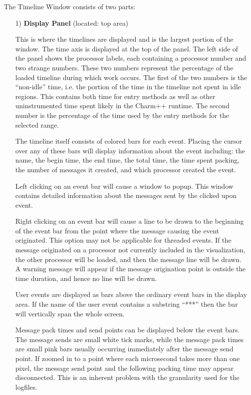 \documentclass[10pt]{report}
\begin{document}
The Timeline Window consists of two parts:
\begin{enumerate}
\item[1)]
{\bf Display Panel} (located: top area)

This is where the timelines are displayed and is the largest portion
of the window.  The time axis is displayed at the top 
of the panel.  The left side of the
panel shows the processor labels, each containing a processor number and
two strange numbers. These two numbers represent the percentage of the
loaded timeline during which work occurs. The first of the two numbers
is the ``non-idle'' time, i.e. the portion of the time in the timeline
not spent in idle regions. This contains both time for entry methods
as well as other uninstrumented time spent likely in the Charm++
runtime. The second number is the percentage of the time used by the
entry methods for the selected range.


The timeline itself consists of colored bars for each event.
Placing the cursor over any of these bars will display information 
about the event including:  the name, the begin time, the end
time, the total time, the time spent packing, the number of messages it
created, and which processor created the event. 

Left clicking on an event bar will cause a window to popup. This
window contains detailed information about the messages sent by the
clicked upon event.

Right clicking on an event bar will cause a line to be drawn to the
beginning of the event bar from the point where the message causing
the event originated. This option may not be applicable for threaded
events. If the message originated on a processor not currently
included in the visualization, the other processor will be loaded, and
then the message line will be drawn. A warning message will appear if
the message origination point is outside the time duration, and hence
no line will be drawn.

User events are displayed as bars above the ordinary
event bars in the display area. If the name of the user event contains a substring ``***'' then the bar will vertically span the whole screen.

Message pack times and send points can be displayed below the event
bars. The message sends are small white tick marks, while the message
pack times are small pink bars usually occurring immediately after the
message send point. If zoomed in to a point where each microsecond
takes more than one pixel, the message send point and the following
packing time may appear disconnected. This is an inherent problem with
the granularity used for the logfiles.



\end{enumerate}
\end{document}
